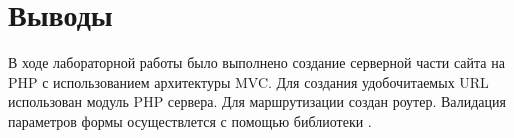 \documentclass[a4paper,14pt]{extarticle}
\begin{document}
\section*{Выводы}
В ходе лабораторной работы было выполнено создание серверной части сайта на PHP
с использованием архитектуры MVC. Для создания удобочитаемых URL использован
 модуль PHP сервера. Для маршрутизации создан роутер. Валидация
параметров формы осуществлется с помощью библиотеки .
\end{document}
